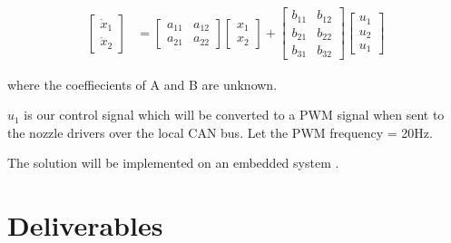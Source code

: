 \begin{align*}
\begin{bmatrix}
    \dot x_1 \\
    \dot x_2
\end{bmatrix}&=
\begin{bmatrix}
    a_{11} &  a_{12} \\
    a_{21} &  a_{22}
\end{bmatrix} 
\begin{bmatrix}
     x_1 \\
     x_2
\end{bmatrix}
+
\begin{bmatrix}
    b_{11} & b_{12} \\
    b_{21} & b_{22} \\
    b_{31} & b_{32}
\end{bmatrix}
\begin{bmatrix}
    u_1 \\
    u_2 \\
    u_1 
\end{bmatrix}
\end{align*}




where the coeffiecients of A and B are unknown.

$u_1$ is our control signal which will be converted to a PWM signal when sent to the nozzle drivers over the local CAN bus. Let the PWM frequency = 20Hz.



The solution will be implemented on an embedded system .

\section{Deliverables}
\label{sec:deliverables}

